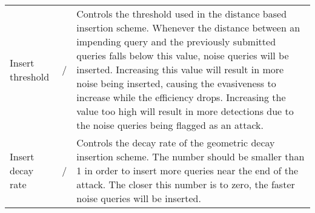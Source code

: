 \begin{longtable}{p{3cm}p{2.5cm}p{7cm}}
Insert threshold &/ &Controls the threshold used in the distance based insertion scheme. Whenever the distance between an impending query and the previously submitted queries falls below this value, noise queries will be inserted. Increasing this value will result in more noise being inserted, causing the evasiveness to increase while the efficiency drops. Increasing the value too high will result in more detections due to the noise queries being flagged as an attack.\\
Insert decay rate &/ &Controls the decay rate of the geometric decay insertion scheme. The number should be smaller than 1 in order to insert more queries near the end of the attack. The closer this number is to zero, the faster noise queries will be inserted.\\
\end{longtable}

